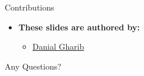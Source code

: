 \documentclass[serif, aspectratio=169]{beamer}
\begin{document}
\begin{frame}{Contributions}
\begin{itemize}
\item \textbf{These slides are authored by:}
\begin{itemize}
    \setlength{\itemsep}{10pt} %
    \item \href{https://github.com/Danial-Gharib}{Danial Gharib}
\end{itemize}
\end{itemize}

\end{frame}

\begin{frame}[allowframebreaks]
    
    
    \nocite{*}
\end{frame}

\begin{frame}
    \begin{center}
        {\Huge Any Questions?}
    \end{center}
\end{frame}
\end{document}

